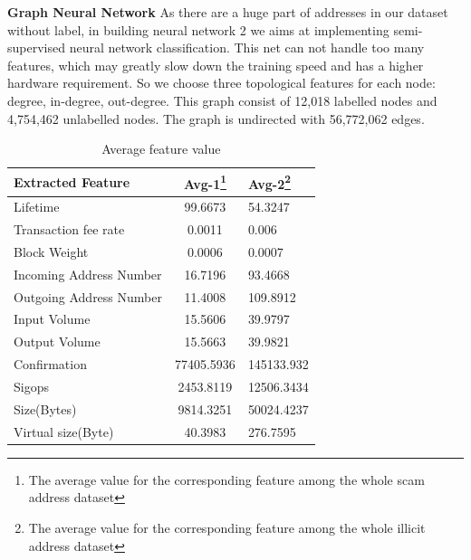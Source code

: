 \textbf{Graph Neural Network}
As there are a huge part of addresses in our dataset without label, in building neural network 2 we aims at implementing semi-supervised neural network classification. This net can not handle too many features, which may greatly slow down the training speed and has a higher hardware requirement. So we choose three topological features for each node: degree, in-degree, out-degree. This graph consist of 12,018 labelled nodes and 4,754,462 unlabelled nodes. The graph is undirected with 56,772,062 edges.
\begin{table}[htbp]
\centering
 \caption{Average feature value\label{table:feature-avg}}
 \begin{tabular}{lcl}
  \toprule
 Extracted Feature& Avg-1\footnote{The average value for the corresponding feature among the whole scam address dataset} & Avg-2\footnote{The average value for the corresponding feature among the whole illicit address dataset} \\
  \midrule
 Lifetime & 99.6673& 54.3247\\
  Transaction fee rate & 0.0011 & 0.006\\
  Block Weight & 0.0006 & 0.0007\\
  Incoming Address Number & 16.7196&93.4668 \\ 
  Outgoing Address Number& 11.4008& 109.8912\\ 
  Input Volume& 15.5606& 39.9797\\
  Output Volume& 15.5663& 39.9821\\ 
 Confirmation & 77405.5936&145133.932 \\
   Sigops& 2453.8119& 12506.3434\\
  Size(Bytes)& 9814.3251& 50024.4237\\
  Virtual size(Byte)& 40.3983&276.7595 \\
  

  \bottomrule
 \end{tabular}
\end{table}


